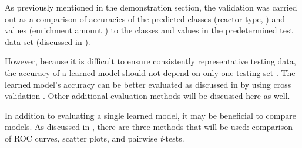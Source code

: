 As previously mentioned in the  demonstration section, the
validation was carried out as a comparison of accuracies of the predicted
classes (reactor type, ) and values
(enrichment amount ) to the classes and values in the
predetermined test data set (discussed in ). 

However, because it is difficult to ensure consistently representative testing
data, the accuracy of a learned model should not depend on only one testing set
. The learned model's accuracy can be
better evaluated as discussed in  by
using cross validation .
Other additional evaluation methods will be discussed here as well. 

In addition to evaluating a single learned model, it may be beneficial to
compare models. As discussed in , there
are three methods that will be used: comparison of \gls{ROC} curves, scatter
plots, and pairwise \textit{t}-tests. 

